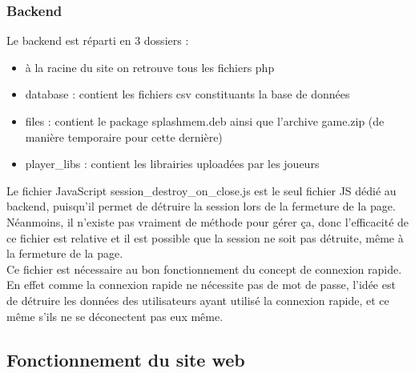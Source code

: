 \documentclass[12pt, openany]{article}
\begin{document}
	\subsubsection{Backend}
	Le backend est réparti en 3 dossiers :
	\begin{itemize}[label=$-$]
		\item à la racine du site on retrouve tous les fichiers php\\
		\item database : contient les fichiers csv constituants la base de données\\
		\item files : contient le package splashmem.deb ainsi que l'archive game.zip (de manière temporaire pour cette dernière)\\
		\item player\_libs : contient les librairies uploadées par les joueurs\\
	\end{itemize}

	Le fichier JavaScript session\_destroy\_on\_close.js est le seul fichier JS dédié au backend, puisqu'il permet de détruire la session lors de la fermeture de la page. Néanmoins, il n'existe pas vraiment de méthode pour gérer ça, donc l'efficacité de ce fichier est relative et il est possible que la session ne soit pas détruite, même à la fermeture de la page.\\
	Ce fichier est nécessaire au bon fonctionnement du concept de connexion rapide. En effet comme la connexion rapide ne nécessite pas de mot de passe, l'idée est de détruire les données des utilisateurs ayant utilisé la connexion rapide, et ce même s'ils ne se déconectent pas eux même.\\

	\subsection{Fonctionnement du site web}
\end{document}
